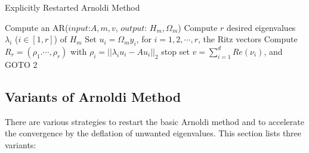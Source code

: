 \begin{algorithm}[htbp]{}
	\caption{Explicitly Restarted Arnoldi Method}   
	\label{alg:arnoldi}   
	\begin{algorithmic}[1]
		\State Compute an AR($input$:$A,m,v$, $output$: $H_m, \Omega_m$)
		\State Compute $r$ desired eigenvalues $\lambda_i$ ($i  \in [1,r] $) of $H_m$
		\State Set $u_i=\Omega_my_i$, for $i=1,2,\cdots, r$, the Ritz vectors    
		\State Compute $R_r=(\rho_1.\cdots, \rho_r)$ with $\rho_i=||\lambda_i u_i - A u_i||_2$
		\State stop
		\Else
		\State set $v=\sum_{i=1}^d Re(\nu_i)$, and GOTO 2
		\EndIf
		\EndFunction
	\end{algorithmic}  
\end{algorithm}

\subsection{Variants of Arnoldi Method}

There are various strategies to restart the basic Arnoldi method and to accelerate the convergence by the deflation of unwanted eigenvalues. This section lists three variants:

